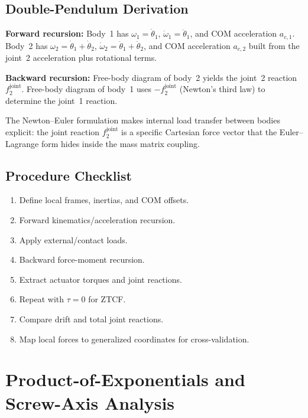 \documentclass[11pt]{article}
\begin{document}
\subsection{Double-Pendulum Derivation}

\textbf{Forward recursion:}
Body~1 has $\omega_1=\dot\theta_1$, $\dot\omega_1=\ddot\theta_1$, and COM acceleration $a_{c,1}$.
Body~2 has $\omega_2=\dot\theta_1+\dot\theta_2$, $\dot\omega_2=\ddot\theta_1+\ddot\theta_2$, and COM acceleration $a_{c,2}$ built from the joint~2 acceleration plus rotational terms.

\textbf{Backward recursion:}
Free-body diagram of body~2 yields the joint~2 reaction $f_2^{\mathrm{joint}}$.
Free-body diagram of body~1 uses $-f_2^{\mathrm{joint}}$ (Newton's third law) to determine the joint~1 reaction.

The Newton--Euler formulation makes internal load transfer between bodies explicit: the joint reaction $f_2^{\mathrm{joint}}$ is a specific Cartesian force vector that the Euler--Lagrange form hides inside the mass matrix coupling.

\subsection{Procedure Checklist}

\begin{enumerate}
\item Define local frames, inertias, and COM offsets.
\item Forward kinematics/acceleration recursion.
\item Apply external/contact loads.
\item Backward force-moment recursion.
\item Extract actuator torques and joint reactions.
\item Repeat with $\tau=0$ for ZTCF.
\item Compare drift and total joint reactions.
\item Map local forces to generalized coordinates for cross-validation.
\end{enumerate}


\section{Product-of-Exponentials and Screw-Axis Analysis}\label{sec:poe-screw}
\end{document}
